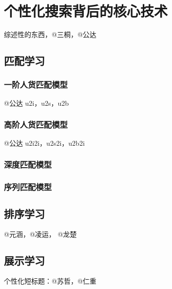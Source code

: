 
\chapter{个性化搜索背后的核心技术}
\thispagestyle{empty}

\setlength{\fboxrule}{0pt}\setlength{\fboxsep}{0cm}
\noindent\shadowbox{
\begin{tcolorbox}[arc=0mm,colback=lightblue,colframe=darkblue,title=学习目标与要求]

\end{tcolorbox}}
\setlength{\fboxrule}{1pt}\setlength{\fboxsep}{4pt} 

综述性的东西，@三桐，@公达

\section{匹配学习}
	
\subsection{一阶人货匹配模型} 
	@公达 u2i，u2s，u2b 

\subsection{高阶人货匹配模型} 
	@公达 u2i2i，u2s2i，u2b2i 

\subsection{深度匹配模型} 

\subsection{序列匹配模型} 
	
\section{排序学习}
	@元涵，@凌运， @龙楚
\subsection{}

\section{展示学习}
	个性化短标题：@苏哲，@仁重 

